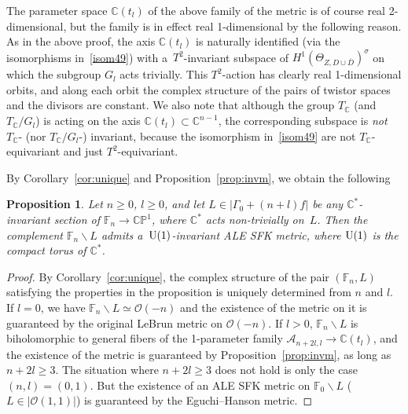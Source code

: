 \documentclass[pdftex]{sigma}
\numberwithin{equation}{section}
\newtheorem{Proposition}[Theorem]{Proposition}
{\theoremstyle{definition}
\newtheorem{Definition}[Theorem]{Definition}
\newtheorem{Remark}[Theorem]{Remark}
}
\begin{document}
\begin{Remark}
The parameter space $\mathbb{C}(t_l)$ of the above family of the metric is of course real 2-dimensional, but the family
is in ef\/fect real 1-dimensional by the following reason.
As in the above proof, the axis $\mathbb{C}(t_l)$ is naturally identif\/ied (via the isomorphisms in~\eqref{isom49})
with a~$T^2$-invariant subspace of $H^1(\Theta_{Z,D\cup \overline D})^{\sigma}$ on which the subgroup $G_l$ acts
trivially.
This $T^2$-action has clearly real 1-dimensional orbits, and along each orbit the complex structure of the pairs of
twistor spaces and the divisors are constant.
We also note that although the group $T_{\mathbb{C}}$ (and $T_{\mathbb{C}}/G_l$) is acting on the axis
$\mathbb{C}(t_l)\subset\mathbb{C}^{n-1}$, the corresponding subspace is {\em not} $T_{\mathbb{C}}$- (nor
$T_{\mathbb{C}}/G_l$-) invariant, because the isomorphism in~\eqref{isom49} are not $T_{\mathbb{C}}$-equivariant and
just $T^2$-equivariant.
\end{Remark}

By Corollary~\ref{cor:unique} and Proposition~\ref{prop:invm}, we obtain the following

\begin{Proposition}
Let $n\ge 0$, $l\ge 0$, and let $L\in |\Gamma_0+(n+l)f|$ be any $\mathbb{C}^*$-invariant section of
$\mathbb{F}_n\to\mathbb{CP}^1$, where $\mathbb{C}^*$ acts non-trivially on~$L$.
Then the complement $\mathbb{F}_n\backslash L$ admits a~${\rm{U}}(1)$-invariant ALE SFK metric, where ${\rm{U}}(1)$ is
the compact torus of $\mathbb{C}^*$.
\end{Proposition}

\begin{proof}
By Corollary~\ref{cor:unique}, the complex structure of the pair $(\mathbb{F}_n,L)$ satisfying the properties in the
proposition is uniquely determined from $n$ and $l$.
If $l=0$, we have $\mathbb{F}_n\backslash L\simeq\mathscr O(-n)$ and the existence of the metric on it is guaranteed by
the original LeBrun metric on $\mathscr O(-n)$.
If $l>0$, $\mathbb{F}_n\backslash L$ is biholomorphic to general f\/ibers of the 1-parameter family $\mathscr
A_{n+2l,l}\to\mathbb{C}(t_l)$, and the existence of the metric is guaranteed by Proposition~\ref{prop:invm}, as long as
$n+2l\ge 3$.
The situation where $n+2l\ge 3$ does not hold is only the case $(n,l) = (0,1)$.
But the existence of an ALE SFK metric on $\mathbb{F}_0\backslash L$ ($L\in|\mathscr O(1,1)|$) is guaranteed by the
Eguchi--Hanson metric.
\end{proof}
\end{document}
